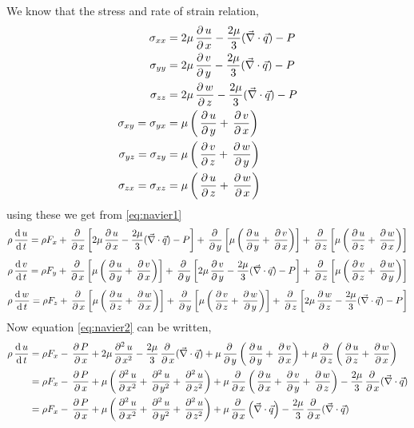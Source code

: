 \documentclass[../main-sheet.tex]{subfiles}
\begin{document}
\begin{soln}
We know that the stress and rate of strain relation,
\begin{align*}
    \sigma_{xx}&=2\mu\,\frac{\partial\, u}{\partial\, x}-\frac{2\mu}{3}(\vec{\nabla}\cdot\vec{q})-P\\
    \sigma_{yy}&=2\mu\,\frac{\partial\, v}{\partial\, y}-\frac{2\mu}{3}(\vec{\nabla}\cdot\vec{q})-P\\
    \sigma_{zz}&=2\mu\,\frac{\partial\, w}{\partial\, z}-\frac{2\mu}{3}(\vec{\nabla}\cdot\vec{q})-P\\
    \sigma_{xy}=\sigma_{yx}&=\mu\left( \,\frac{\partial\, u}{\partial\, y}+\,\frac{\partial\, v}{\partial\, x} \right)\\
    \sigma_{yz}=\sigma_{zy}&=\mu\left( \,\frac{\partial\, v}{\partial\, z}+\,\frac{\partial\, w}{\partial\, y} \right)\\
    \sigma_{zx}=\sigma_{xz}&=\mu\left( \,\frac{\partial\, u}{\partial\, z}+\,\frac{\partial\, w}{\partial\, x} \right)
\end{align*}
using these we get from \eqref{eq:navier1}
\begin{equation}
    \rho\,\frac{\mathrm{d}\,u}{\mathrm{d}\,t}=\rho F_x+\,\frac{\partial\, }{\partial\, x}\left[ 2\mu\,\frac{\partial\, u}{\partial\, x}-\frac{2\mu}{3}(\vec{\nabla}\cdot\vec{q})-P \right]+\,\frac{\partial\, }{\partial\, y}\left[ \mu\left( \,\frac{\partial\, u}{\partial\, y}+\,\frac{\partial\, v}{\partial\, x} \right) \right]+\,\frac{\partial\, }{\partial\, z}\left[ \mu\left( \,\frac{\partial\, u}{\partial\, z}+\,\frac{\partial\, w}{\partial\, x} \right) \right]
    \label{eq:navier2}
\end{equation}
\begin{equation}
    \rho\,\frac{\mathrm{d}\,v}{\mathrm{d}\,t}=\rho F_y+\,\frac{\partial\, }{\partial\, x}\left[\mu\left( \,\frac{\partial\, u}{\partial\, y}+\,\frac{\partial\, v}{\partial\, x} \right)\right]+\,\frac{\partial\, }{\partial\, y}\left[2\mu\,\frac{\partial\, v}{\partial\, y}-\frac{2\mu}{3}(\vec{\nabla}\cdot\vec{q})-P\right]+\,\frac{\partial\, }{\partial\, z}\left[\mu\left( \,\frac{\partial\, v}{\partial\, z}+\,\frac{\partial\, w}{\partial\, y} \right)\right]
    \label{eq:navier3}
\end{equation}
\begin{equation}
    \rho\,\frac{\mathrm{d}\,w}{\mathrm{d}\,t}=\rho F_z+\,\frac{\partial\, }{\partial\, x}\left[\mu\left( \,\frac{\partial\, u}{\partial\, z}+\,\frac{\partial\, w}{\partial\, x} \right)\right]+\,\frac{\partial\, }{\partial\, y}\left[\mu\left( \,\frac{\partial\, v}{\partial\, z}+\,\frac{\partial\, w}{\partial\, y} \right)\right]+\,\frac{\partial\, }{\partial\, z}\left[2\mu\,\frac{\partial\, w}{\partial\, z}-\frac{2\mu}{3}(\vec{\nabla}\cdot\vec{q})-P\right]
    \label{eq:navier4}
\end{equation}
Now equation \eqref{eq:navier2} can be written,
\begin{align*}
    \rho\ddt{u}&=\rho F_x-\pardx{P}+2\mu\parxn{u}{2}-\frac{2\mu}{3}\pardx{}(\vec{\nabla}\cdot \vec{q})+\mu\pardy{}\left( \pardy{u}+\pardx{v} \right)+\mu\pardz{}\left( \pardz{u}+\pardx{w}  \right)\\
    &=\rho F_x-\pardx{P}+\mu\left(\parxn{u}{2}+\paryn{u}{2}+\parzn{u}{2}\right) +\mu\pardx{}\left( \pardx{u}+\pardy{v}+\pardz{w} \right)-\frac{2\mu}{3}\pardx{}(\vec{\nabla}\cdot \vec{q})\\
    &=\rho F_x-\pardx{P}+\mu\left(\parxn{u}{2}+\paryn{u}{2}+\parzn{u}{2}\right) +\mu\pardx{}\left( \vec{\nabla}\cdot \vec{q}\right)-\frac{2\mu}{3}\pardx{}(\vec{\nabla}\cdot \vec{q})\\

\end{align*}
\end{soln}
\end{document}
